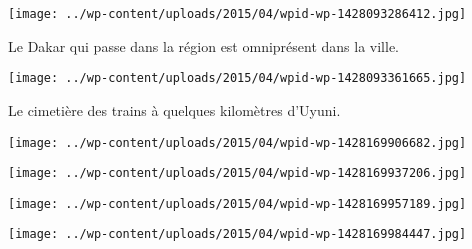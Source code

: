  \newline
\centerline{\texttt{[image: ../wp-content/uploads/2015/04/wpid-wp-1428093286412.jpg]} } 
 \newline
 Le Dakar qui passe dans la région est omniprésent dans la ville.  \newline
 \newline
\centerline{\texttt{[image: ../wp-content/uploads/2015/04/wpid-wp-1428093361665.jpg]} } 
 \newline
 Le cimetière des trains à quelques kilomètres d'Uyuni.  \newline
 \newline
\centerline{\texttt{[image: ../wp-content/uploads/2015/04/wpid-wp-1428169906682.jpg]} } 
 \newline
 \newline
\centerline{\texttt{[image: ../wp-content/uploads/2015/04/wpid-wp-1428169937206.jpg]} } 
 \newline
 \newline
\centerline{\texttt{[image: ../wp-content/uploads/2015/04/wpid-wp-1428169957189.jpg]} } 
 \newline
 \newline
\centerline{\texttt{[image: ../wp-content/uploads/2015/04/wpid-wp-1428169984447.jpg]} } 
 \newline

\newpage
 
